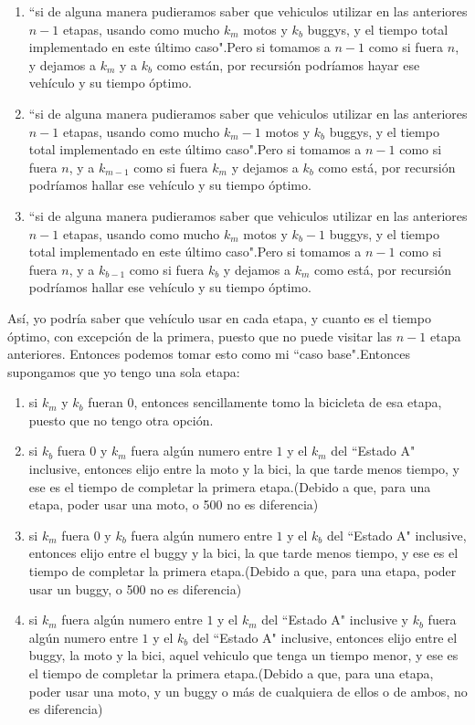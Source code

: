 \begin{enumerate}
	\item ``si de alguna manera pudieramos saber que vehiculos utilizar en las anteriores $n-1$ etapas, usando como mucho $k_{m}$ motos y $k_{b}$ buggys, y el tiempo total implementado en este último caso".Pero si tomamos a $n-1$ como si fuera $n$, y dejamos a $k_{m}$ y a $k_{b}$ como están, por recursión podríamos hayar ese vehículo y su tiempo óptimo.
	\item ``si de alguna manera pudieramos saber que vehiculos utilizar en las anteriores $n-1$ etapas, usando como mucho $k_{m}-1$ motos y $k_{b}$ buggys, y el tiempo total implementado en este último caso".Pero si tomamos a $n-1$ como si fuera $n$, y a $k_{m-1}$ como si fuera $k_{m}$ y dejamos a $k_{b}$ como está, por recursión podríamos hallar ese vehículo y su tiempo óptimo.
	\item ``si de alguna manera pudieramos saber que vehiculos utilizar en las anteriores $n-1$ etapas, usando como mucho $k_{m}$ motos y $k_{b}-1$ buggys, y el tiempo total implementado en este último caso".Pero si tomamos a $n-1$ como si fuera $n$, y a $k_{b-1}$ como si fuera $k_{b}$ y dejamos a $k_{m}$ como está, por recursión podríamos hallar ese vehículo y su tiempo óptimo.
\end{enumerate}

Así, yo podría saber que vehículo usar en cada etapa, y cuanto es el tiempo óptimo, con excepción de la primera, puesto que no puede visitar las $n-1$ etapa anteriores. Entonces podemos tomar esto como mi ``caso base".Entonces supongamos que yo tengo una sola etapa:
  \begin{enumerate}
  \item si $k_{m}$ y $k_{b}$ fueran $0$, entonces sencillamente tomo la bicicleta de esa etapa, puesto que no tengo otra opción.
  \item si $k_{b}$ fuera $0$ y $k_{m}$ fuera algún numero entre $1$ y el $k_{m}$ del ``Estado A" inclusive, entonces elijo entre la moto y la bici, la que tarde menos tiempo, y ese es el tiempo de completar la primera etapa.(Debido a que, para una etapa, poder usar una moto, o 500 no es diferencia)
  \item si $k_{m}$ fuera $0$ y $k_{b}$ fuera algún numero entre $1$ y el $k_{b}$ del ``Estado A" inclusive, entonces elijo entre el buggy y la bici, la que tarde menos tiempo, y ese es el tiempo de completar la primera etapa.(Debido a que, para una etapa, poder usar un buggy, o 500 no es diferencia)
  \item si $k_{m}$ fuera algún numero entre $1$ y el $k_{m}$ del ``Estado A" inclusive y $k_{b}$ fuera algún numero entre $1$ y el $k_{b}$ del ``Estado A" inclusive, entonces elijo entre el buggy, la moto y la bici, aquel vehiculo que tenga un tiempo menor, y ese es el tiempo de completar la primera etapa.(Debido a que, para una etapa, poder usar una moto, y un buggy o más de cualquiera de ellos o de ambos, no es diferencia)
  \end{enumerate}
  
